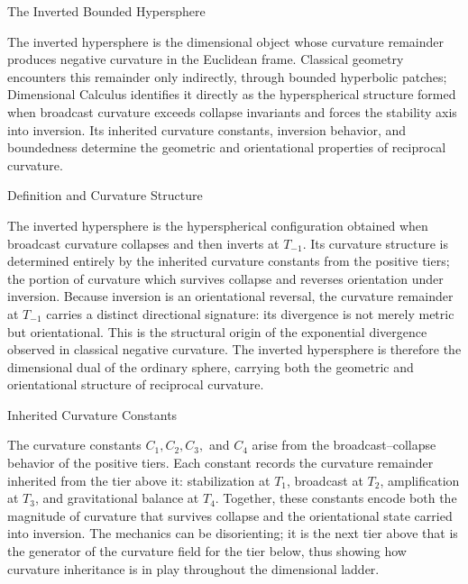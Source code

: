 \documentclass[final,onefignum,onetabnum]{siamart}
\begin{document}
\begin{section}{The Inverted Bounded Hypersphere}

The inverted hypersphere is the dimensional object whose curvature remainder produces negative curvature in the Euclidean frame. Classical geometry encounters this remainder only indirectly, through bounded hyperbolic patches; Dimensional Calculus identifies it directly as the hyperspherical structure formed when broadcast curvature exceeds collapse invariants and forces the stability axis into inversion. Its inherited curvature constants, inversion behavior, and boundedness determine the geometric and orientational properties of reciprocal curvature.

\begin{subsection}{Definition and Curvature Structure}

The inverted hypersphere is the hyperspherical configuration obtained when broadcast curvature collapses and then inverts at $T_{-1}$. Its curvature structure is determined entirely by the inherited curvature constants from the positive tiers; the portion of curvature which survives collapse and reverses orientation under inversion.
Because inversion is an orientational reversal, the curvature remainder at $T_{-1}$ carries a distinct directional signature: its divergence is not merely metric but orientational. This is the structural origin of the exponential divergence observed in classical negative curvature. The inverted hypersphere is therefore the dimensional dual of the ordinary sphere, carrying both the geometric and orientational structure of reciprocal curvature.
\end{subsection}

\begin{subsection}{Inherited Curvature Constants}

The curvature constants $C_1, C_2, C_3,$ and $C_4$ arise from the broadcast–collapse behavior of the positive tiers. Each constant records the curvature remainder inherited from the tier above it: stabilization at $T_1$, broadcast at $T_2$, amplification at $T_3$, and gravitational balance at $T_4$. Together, these constants encode both the magnitude of curvature that survives collapse and the orientational state carried into inversion. The mechanics can be disorienting; it is the next tier above that is the generator of the curvature field for the tier below, thus showing how curvature inheritance is in play throughout the dimensional ladder.


\end{subsection}
\end{section}
\end{document}

